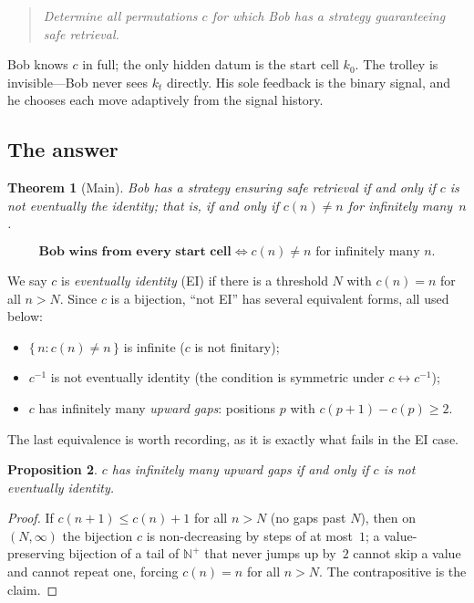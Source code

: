 \documentclass{article}
\newtheorem{theorem}{Theorem}[section]
\newtheorem{proposition}[theorem]{Proposition}
\newcommand{\Np}{\mathbb{N}^{+}}
\begin{document}
\begin{quote}
\itshape Determine all permutations $c$ for which Bob has a strategy
guaranteeing safe retrieval.
\end{quote}

Bob knows $c$ in full; the only hidden datum is the start cell $k_0$. The
trolley is invisible---Bob never sees $k_t$ directly. His sole feedback
is the binary signal, and he chooses each move adaptively from the
signal history.

\subsection{The answer}

\begin{theorem}[Main]\label{thm:main}
Bob has a strategy ensuring safe retrieval if and only if $c$ is
\emph{not eventually the identity}; that is, if and only if
$c(n)\neq n$ for infinitely many~$n$.
\end{theorem}

\[
  \boxed{\;\textbf{Bob wins from every start cell} \iff
  c(n)\neq n \text{ for infinitely many } n.\;}
\]

We say $c$ is \emph{eventually identity} (EI) if there is a threshold
$N$ with $c(n)=n$ for all $n>N$. Since $c$ is a bijection, ``not EI'' has
several equivalent forms, all used below:
\begin{itemize}[topsep=2pt,itemsep=1pt]
  \item $\{\,n : c(n)\neq n\,\}$ is infinite ($c$ is not finitary);
  \item $c^{-1}$ is not eventually identity (the condition is symmetric
  under $c\leftrightarrow c^{-1}$);
  \item $c$ has infinitely many \emph{upward gaps}: positions $p$ with
  $c(p{+}1)-c(p)\ge 2$.
\end{itemize}
The last equivalence is worth recording, as it is exactly what fails in
the EI case.

\begin{proposition}\label{prop:gaps}
$c$ has infinitely many upward gaps if and only if $c$ is not eventually
identity.
\end{proposition}
\begin{proof}
If $c(n{+}1)\le c(n)+1$ for all $n>N$ (no gaps past $N$), then on
$(N,\infty)$ the bijection $c$ is non-decreasing by steps of at most~$1$;
a value-preserving bijection of a tail of $\Np$ that never
jumps up by~$2$ cannot skip a value and cannot repeat one, forcing
$c(n)=n$ for all $n>N$. The contrapositive is the claim.
\end{proof}
\end{document}

